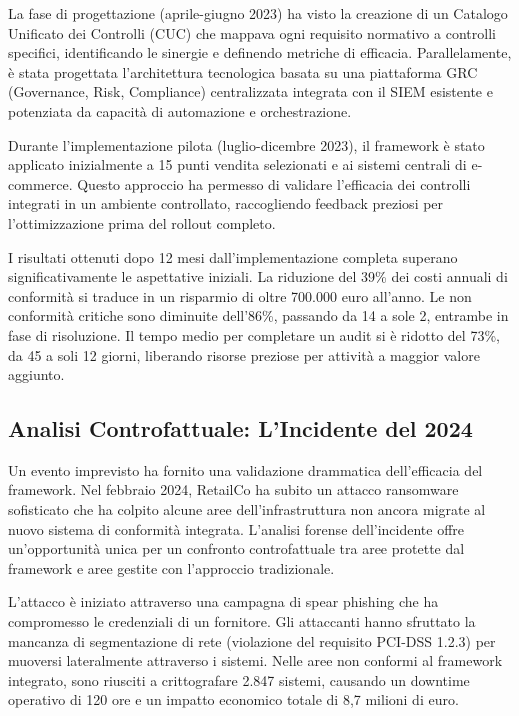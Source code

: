 La fase di progettazione (aprile-giugno 2023) ha visto la creazione di un Catalogo Unificato dei Controlli (CUC) che mappava ogni requisito normativo a controlli specifici, identificando le sinergie e definendo metriche di efficacia. Parallelamente, è stata progettata l'architettura tecnologica basata su una piattaforma GRC (Governance, Risk, Compliance) centralizzata integrata con il SIEM esistente e potenziata da capacità di automazione e orchestrazione.

Durante l'implementazione pilota (luglio-dicembre 2023), il framework è stato applicato inizialmente a 15 punti vendita selezionati e ai sistemi centrali di e-commerce. Questo approccio ha permesso di validare l'efficacia dei controlli integrati in un ambiente controllato, raccogliendo feedback preziosi per l'ottimizzazione prima del rollout completo.

I risultati ottenuti dopo 12 mesi dall'implementazione completa superano significativamente le aspettative iniziali. La riduzione del 39\% dei costi annuali di conformità si traduce in un risparmio di oltre 700.000 euro all'anno. Le non conformità critiche sono diminuite dell'86\%, passando da 14 a sole 2, entrambe in fase di risoluzione. Il tempo medio per completare un audit si è ridotto del 73\%, da 45 a soli 12 giorni, liberando risorse preziose per attività a maggior valore aggiunto.

\subsection{Analisi Controfattuale: L'Incidente del 2024}
\label{subsec:4.4.2_controfattuale}

Un evento imprevisto ha fornito una validazione drammatica dell'efficacia del framework. Nel febbraio 2024, RetailCo ha subito un attacco ransomware sofisticato che ha colpito alcune aree dell'infrastruttura non ancora migrate al nuovo sistema di conformità integrata. L'analisi forense dell'incidente offre un'opportunità unica per un confronto controfattuale tra aree protette dal framework e aree gestite con l'approccio tradizionale.

L'attacco è iniziato attraverso una campagna di spear phishing che ha compromesso le credenziali di un fornitore. Gli attaccanti hanno sfruttato la mancanza di segmentazione di rete (violazione del requisito PCI-DSS 1.2.3) per muoversi lateralmente attraverso i sistemi. Nelle aree non conformi al framework integrato, sono riusciti a crittografare 2.847 sistemi, causando un downtime operativo di 120 ore e un impatto economico totale di 8,7 milioni di euro.

